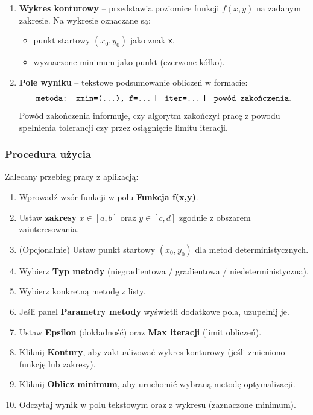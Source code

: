 \documentclass[10pt,a4paper]{article}
\begin{document}
\begin{enumerate}
\item \textbf{Wykres konturowy} – przedstawia poziomice funkcji $f(x,y)$ na zadanym zakresie.
Na wykresie oznaczane są:
\begin{itemize}
\item punkt startowy $(x_0,y_0)$ jako znak \texttt{x},
\item wyznaczone minimum jako punkt (czerwone kółko).
\end{itemize}

\item \textbf{Pole wyniku} – tekstowe podsumowanie obliczeń w formacie:
\[
\texttt{metoda: xmin=(\dots), f=\dots \;|\; iter=\dots \;|\; powód zakończenia}.
\]
Powód zakończenia informuje, czy algorytm zakończył pracę z powodu spełnienia tolerancji
czy przez osiągnięcie limitu iteracji.
\end{enumerate}

\subsubsection{Procedura użycia}

Zalecany przebieg pracy z aplikacją:

\begin{enumerate}
\item Wprowadź wzór funkcji w polu \textbf{Funkcja f(x,y)}.
\item Ustaw \textbf{zakresy} $x\in[a,b]$ oraz $y\in[c,d]$ zgodnie z obszarem zainteresowania.
\item (Opcjonalnie) Ustaw punkt startowy \textbf{$(x_0,y_0)$} dla metod deterministycznych.
\item Wybierz \textbf{Typ metody} (niegradientowa / gradientowa / niedeterministyczna).
\item Wybierz konkretną metodę z listy.
\item Jeśli panel \textbf{Parametry metody} wyświetli dodatkowe pola, uzupełnij je.
\item Ustaw \textbf{Epsilon} (dokładność) oraz \textbf{Max iteracji} (limit obliczeń).
\item Kliknij \textbf{Kontury}, aby zaktualizować wykres konturowy (jeśli zmieniono funkcję lub zakresy).
\item Kliknij \textbf{Oblicz minimum}, aby uruchomić wybraną metodę optymalizacji.
\item Odczytaj wynik w polu tekstowym oraz z wykresu (zaznaczone minimum).
\end{enumerate}
\end{document}

